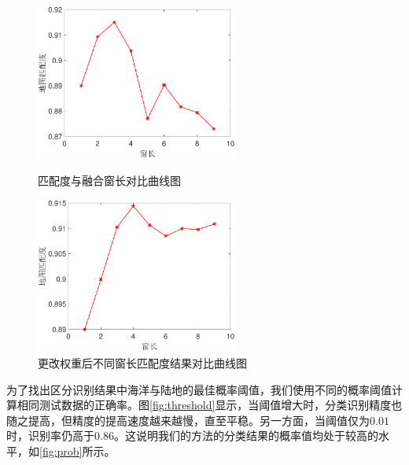 \begin{figure}[H]
	\centering
	\begin{minipage}{7cm}
		\centering
		\includegraphics[width=6.67cm]{figures/othr/window}
		\caption{匹配度与融合窗长对比曲线图}
		\label{fig:window}
	\end{minipage}
	\hspace{10pt}
	\begin{minipage}{7cm}
		\centering
		\includegraphics[width=6.67cm]{figures/othr/weighted_window}
		\caption{更改权重后不同窗长匹配度结果对比曲线图}
		\label{fig:weighted_window}
	\end{minipage}

\end{figure}


为了找出区分识别结果中海洋与陆地的最佳概率阈值，我们使用不同的概率阈值计算相同测试数据的正确率。图\ref{fig:threshold}显示，当阈值增大时，分类识别精度也随之提高，但精度的提高速度越来越慢，直至平稳。另一方面，当阈值仅为$0.01$时，识别率仍高于$0.86$。这说明我们的方法的分类结果的概率值均处于较高的水平，如\ref{fig:prob}所示。

